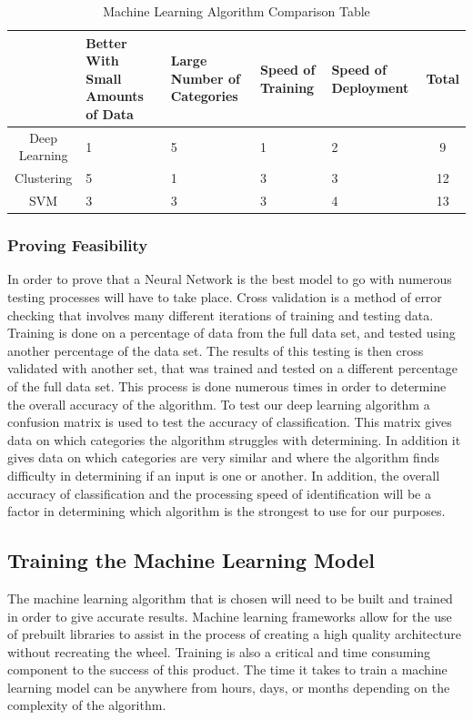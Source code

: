 \documentclass[12pt,journal,compsoc]{IEEEtran}
\newenvironment{subs}
  {\adjustwidth{1em}{0pt}}
  {\endadjustwidth}
\begin{document}
\begin{subs}
\begin{subs}
\begin{table}[H]
\renewcommand{\arraystretch}{1.3}
\caption{Machine Learning Algorithm Comparison Table}
\label{table:ml}
\centering
\begin{tabular}{|c||m{8em}|m{8em}|m{8em}|m{8em}||c|}
\hline
&
Better With Small Amounts of Data
&
Large Number of Categories
&
Speed of Training
&
Speed of Deployment
&
Total\\
\hline
\hline
Deep Learning & 1 & 5 & 1 & 2 & 9\\
\hline
Clustering & 5 & 1 & 3 & 3 & 12\\
\hline
SVM & 3 & 3 & 3 & 4 & 13\\
\hline
\end{tabular}
\end{table}

\subsubsection{Proving Feasibility}
In order to prove that a Neural Network is the best model to go with numerous testing processes will have to take place. Cross validation is a method of error checking that involves many different iterations of training and testing data. Training is done on a percentage of data from the full data set, and tested using another percentage of the data set. The results of this testing is then cross validated with another set, that was trained and tested on a different percentage of the full data set. This process is done numerous times in order to determine the overall accuracy of the algorithm. To test our deep learning algorithm a confusion matrix is used to test the accuracy of classification. This matrix gives data on which categories the algorithm struggles with determining. In addition it gives data on which categories are very similar and where the algorithm finds difficulty in determining if an input is one or another. In addition, the overall accuracy of classification and the processing speed of identification will be a factor in determining which algorithm is the strongest to use for our purposes.

\end{subs}

\subsection{Training the Machine Learning Model}
The machine learning algorithm that is chosen will need to be built and  trained in order to give accurate results. Machine learning frameworks allow for the use of prebuilt libraries to assist in the process of creating a high quality architecture without recreating the wheel. Training is also a critical and time consuming component to the success of this product. The time it takes to train a machine learning model can be anywhere from hours, days, or months depending on the complexity of the algorithm.


\end{subs}
\end{document}
